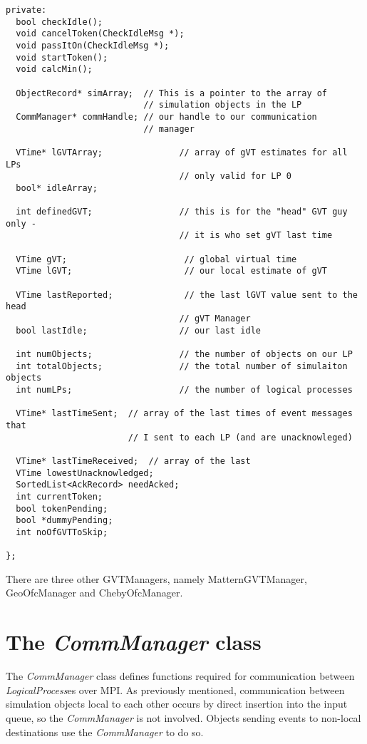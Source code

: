 \documentclass[11pt]{report}
\begin{document}
\begin{verbatim}
private:
  bool checkIdle();
  void cancelToken(CheckIdleMsg *);
  void passItOn(CheckIdleMsg *);
  void startToken();
  void calcMin();

  ObjectRecord* simArray;  // This is a pointer to the array of 
                           // simulation objects in the LP
  CommManager* commHandle; // our handle to our communication 
                           // manager

  VTime* lGVTArray;               // array of gVT estimates for all LPs
                                  // only valid for LP 0
  bool* idleArray;

  int definedGVT;                 // this is for the "head" GVT guy only -
                                  // it is who set gVT last time

  VTime gVT;                       // global virtual time
  VTime lGVT;                      // our local estimate of gVT

  VTime lastReported;              // the last lGVT value sent to the head
                                  // gVT Manager
  bool lastIdle;                  // our last idle

  int numObjects;                 // the number of objects on our LP
  int totalObjects;               // the total number of simulaiton objects
  int numLPs;                     // the number of logical processes

  VTime* lastTimeSent;  // array of the last times of event messages that
                        // I sent to each LP (and are unacknowleged)

  VTime* lastTimeReceived;  // array of the last
  VTime lowestUnacknowledged;
  SortedList<AckRecord> needAcked;
  int currentToken;
  bool tokenPending;
  bool *dummyPending;
  int noOfGVTToSkip;

};
\end{verbatim}
There are three other GVTManagers, namely MatternGVTManager,
GeoOfcManager and ChebyOfcManager.  

\section{The {\it CommManager} class}

The {\it CommManager} class defines functions required for communication
between {\it LogicalProcess}es over MPI.  As previously mentioned,
communication between simulation objects local to each other occurs by
direct insertion into the input queue, so the {\it CommManager} is not
involved.  Objects sending events to non-local destinations use the {\it
CommManager} to do so.
\end{document}
